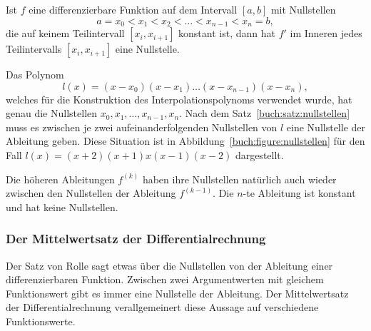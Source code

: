 \begin{satz}
\label{buch:satz:nullstellen}
Ist $f$ eine differenzierbare Funktion auf dem Intervall $[a,b]$
mit Nullstellen 
\[
a=x_0 < x_1 < x_2 < \dots < x_{n-1} < x_n = b,
\]
die auf keinem Teilintervall $[x_i,x_{i+1}]$ konstant ist,
dann hat $f'$ im Inneren jedes Teilintervalls $[x_i, x_{i+1}]$
eine Nullstelle.
\end{satz}

Das Polynom 
\[
l(x) = (x-x_0)(x-x_1)\dots (x-x_{n-1})(x-x_n),
\]
welches für die Konstruktion des Interpolationspolynoms verwendet
wurde, hat genau die Nullstellen $x_0,x_1,\dots,x_{n-1},x_n$.
Nach dem Satz~\ref{buch:satz:nullstellen} muss es zwischen je
zwei aufeinanderfolgenden Nullstellen von $l$ eine Nullstelle der
Ableitung geben. 
Diese Situation ist in Abbildung~\ref{buch:figure:nullstellen}
für den Fall $l(x)=(x+2)(x+1)x(x-1)(x-2)$ dargestellt.

Die höheren Ableitungen $f^{(k)}$ haben ihre Nullstellen
natürlich auch wieder zwischen den Nullstellen der Ableitung $f^{(k-1)}$.
Die $n$-te Ableitung ist konstant und hat keine Nullstellen.


\subsubsection{Der Mittelwertsatz der Differentialrechnung}
%
%
Der Satz von Rolle sagt etwas über die Nullstellen von der Ableitung
einer differenzierbaren Funktion.
%
Zwischen zwei Argumentwerten mit gleichem Funktionswert gibt es immer
eine Nullstelle der Ableitung.
Der Mittelwertsatz der Differentialrechnung verallgemeinert diese
Aussage auf verschiedene Funktionswerte.

